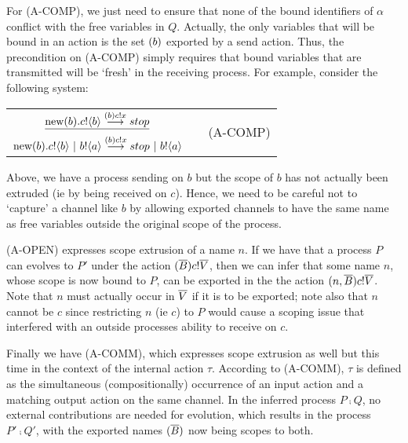 For (A-COMP), we just need to ensure that none of the bound identifiers of $\alpha$ conflict with the free variables in $Q$.  Actually, the only variables that will be bound in an action is the set $({b})$ exported by a send action.  Thus, the precondition on (A-COMP) simply requires that bound variables that are transmitted will be `fresh' in the receiving process.  For example, consider the following system:
\begin{center}\begin{tabular}{rllll}
	\multicolumn{3}{c}{$\underline{\text{new}({b}).{c}!\langle{b}\rangle\overset{{({b}){c}!{x}}}{\longrightarrow} stop}$} & & \multirow{2}{*}{\tiny{(A-COMP)}}\\
	\multicolumn{3}{c}{$\text{new}({b}).{c}!\langle{b}\rangle \ |\  {b}!\langle{a}\rangle\overset{{({b}){c}!{x}}}{\longrightarrow} stop\ |\  {b}!\langle{a}\rangle$}\\[10pt]
\end{tabular}\end{center}
Above, we have a process sending on $b$ but the scope of $b$ has not actually been extruded (ie by being received on $c$).  Hence, we need to be careful not to `capture' a channel like $b$ by allowing exported channels to have the same name as free variables outside the original scope of the process.

(A-OPEN) expresses scope extrusion of a name $n$.  If we have that a process $P$ can evolves to $P'$ under the action $({\overline{B}}){c}!{\overline{V}}$, then we can infer that some name $n$, whose scope is now bound to $P$, can be exported in the the action $({n,\overline{B}}){c}!{\overline{V}}$.  Note that $n$ must actually occur in $\overline{V}$ if it is to be exported; note also that $n$ cannot be $c$ since restricting $n$ (ie $c$) to $P$ would cause a scoping issue that interfered with an outside processes ability to receive on $c$.

Finally we have (A-COMM), which expresses scope extrusion as well but this time in the context of the internal action $\tau$.  According to (A-COMM), $\tau$ is defined as the simultaneous (compositionally) occurrence of an input action and a matching output action on the same channel.  In the inferred process $P\comp Q$, no external contributions are needed for evolution, which results in the process $P'\comp Q'$, with the exported names $({\overline{B}})$ now being scopes to both.

